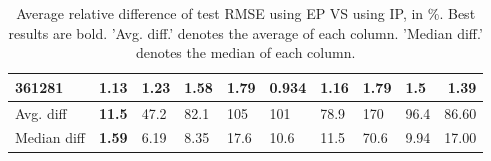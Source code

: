 \begin{table}[ht!]
\begin{tabular}{lllllllllr}
  361281 & 1.13 & 1.23 & 1.58 & 1.79 & \textbf{0.934} & 1.16 & 1.79 & 1.5 & 1.39 \\ 
   \hline
Avg. diff & \textbf{11.5} & 47.2 & 82.1 & 105 & 101 & 78.9 & 170 & 96.4 & 86.60 \\ 
  Median diff & \textbf{1.59} & 6.19 & 8.35 & 17.6 & 10.6 & 11.5 & 70.6 & 9.94 & 17.00 \\ 
   \hline
\hline
\end{tabular}
\endgroup
\caption{Average relative difference of test RMSE using EP VS using IP, in \%. 
                  Best results are bold. 
                  'Avg. diff.' denotes the average of each column.
                  'Median diff.' denotes the median of each column.} 
\label{TABLES/table_results_RMSE_umap_only_num_features_EP_VS_IP}
\end{table}
